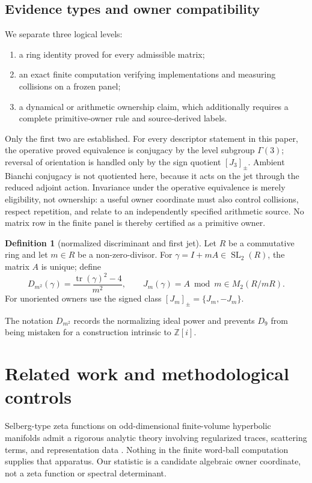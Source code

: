 \documentclass[11pt,a4paper]{article}
\theoremstyle{definition}
\newtheorem{definition}[theorem]{Definition}
\theoremstyle{remark}
\newcommand{\SL}{\operatorname{SL}}
\newcommand{\tr}{\operatorname{tr}}
\newcommand{\Gauss}{\mathbb{Z}[i]}
\begin{document}
\subsection{Evidence types and owner compatibility}

We separate three logical levels:
\begin{enumerate}[label=(\roman*)]
 \item a ring identity proved for every admissible matrix;
 \item an exact finite computation verifying implementations and measuring collisions on a frozen panel;
 \item a dynamical or arithmetic ownership claim, which additionally requires a complete primitive-owner rule and source-derived labels.
\end{enumerate}
Only the first two are established. For every descriptor statement in this paper, the operative proved equivalence is conjugacy by the level subgroup \(\Gamma(3)\); reversal of orientation is handled only by the sign quotient \([J_3]_{\pm}\). Ambient Bianchi conjugacy is not quotiented here, because it acts on the jet through the reduced adjoint action. Invariance under the operative equivalence is merely eligibility, not ownership: a useful owner coordinate must also control collisions, respect repetition, and relate to an independently specified arithmetic source. No matrix row in the finite panel is thereby certified as a primitive owner.

\begin{definition}[normalized discriminant and first jet]
Let \(R\) be a commutative ring and let \(m\in R\) be a non-zero-divisor.
For \(\gamma=I+mA\in\SL_2(R)\), the matrix \(A\) is unique; define
\[
 D_{m^2}(\gamma)=\frac{\tr(\gamma)^2-4}{m^2},
 \qquad J_m(\gamma)=A\bmod m\in M_2(R/mR).
\]
For unoriented owners use the signed class \([J_m]_{\pm}=\{J_m,-J_m\}\).
\end{definition}

The notation \(D_{m^2}\) records the normalizing ideal power and prevents \(D_9\) from being mistaken for a construction intrinsic to \(\Gauss\).

\section{Related work and methodological controls}

Selberg-type zeta functions on odd-dimensional finite-volume hyperbolic manifolds admit a rigorous analytic theory involving regularized traces, scattering terms, and representation data \citep[abstract and Secs.~3--5]{Pfaff2015}. Nothing in the finite word-ball computation supplies that apparatus. Our statistic is a candidate algebraic owner coordinate, not a zeta function or spectral determinant.
\end{document}
